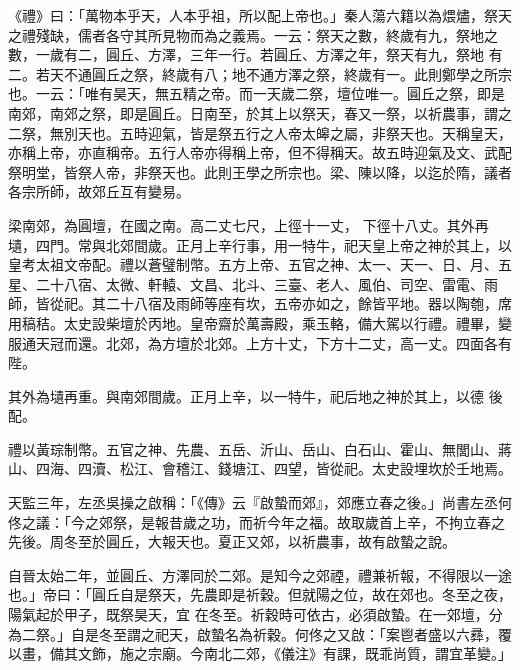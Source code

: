 \begin{pinyinscope}
 《禮》曰：「萬物本乎天，人本乎祖，所以配上帝也。」秦人蕩六籍以為煨燼，祭天之禮殘缺，儒者各守其所見物而為之義焉。一云：祭天之數，終歲有九，祭地之數，一歲有二，圓丘、方澤，三年一行。若圓丘、方澤之年，祭天有九，祭地
 有二。若天不通圓丘之祭，終歲有八；地不通方澤之祭，終歲有一。此則鄭學之所宗也。一云：「唯有昊天，無五精之帝。而一天歲二祭，壇位唯一。圓丘之祭，即是南郊，南郊之祭，即是圓丘。日南至，於其上以祭天，春又一祭，以祈農事，謂之二祭，無別天也。五時迎氣，皆是祭五行之人帝太皞之屬，非祭天也。天稱皇天，亦稱上帝，亦直稱帝。五行人帝亦得稱上帝，但不得稱天。故五時迎氣及文、武配祭明堂，皆祭人帝，非祭天也。此則王學之所宗也。梁、陳以降，以迄於隋，議者各宗所師，故郊丘互有變易。



 梁南郊，為圓壇，在國之南。高二丈七尺，上徑十一丈，
 下徑十八丈。其外再壝，四門。常與北郊間歲。正月上辛行事，用一特牛，祀天皇上帝之神於其上，以皇考太祖文帝配。禮以蒼璧制幣。五方上帝、五官之神、太一、天一、日、月、五星、二十八宿、太微、軒轅、文昌、北斗、三臺、老人、風伯、司空、雷電、雨師，皆從祀。其二十八宿及雨師等座有坎，五帝亦如之，餘皆平地。器以陶匏，席用稿秸。太史設柴壇於丙地。皇帝齋於萬壽殿，乘玉輅，備大駕以行禮。禮畢，變服通天冠而還。北郊，為方壇於北郊。上方十丈，下方十二丈，高一丈。四面各有陛。



 其外為壝再重。與南郊間歲。正月上辛，以一特牛，祀后地之神於其上，以德
 後配。



 禮以黃琮制幣。五官之神、先農、五岳、沂山、岳山、白石山、霍山、無閭山、蔣山、四海、四瀆、松江、會稽江、錢塘江、四望，皆從祀。太史設埋坎於壬地焉。



 天監三年，左丞吳操之啟稱：「《傳》云『啟蟄而郊』，郊應立春之後。」尚書左丞何佟之議：「今之郊祭，是報昔歲之功，而祈今年之福。故取歲首上辛，不拘立春之先後。周冬至於圓丘，大報天也。夏正又郊，以祈農事，故有啟蟄之說。



 自晉太始二年，並圓丘、方澤同於二郊。是知今之郊禋，禮兼祈報，不得限以一途也。」帝曰：「圓丘自是祭天，先農即是祈穀。但就陽之位，故在郊也。冬至之夜，陽氣起於甲子，既祭昊天，宜
 在冬至。祈穀時可依古，必須啟蟄。在一郊壇，分為二祭。」自是冬至謂之祀天，啟蟄名為祈穀。何佟之又啟：「案鬯者盛以六彞，覆以畫，備其文飾，施之宗廟。今南北二郊，《儀注》有課，既乖尚質，謂宜革變。」




\end{pinyinscope}
